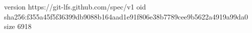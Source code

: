 version https://git-lfs.github.com/spec/v1
oid sha256:f355a45f5f36399db9088b164aad1e91f806e38b7789cee9b5622a4919a99da0
size 6918
